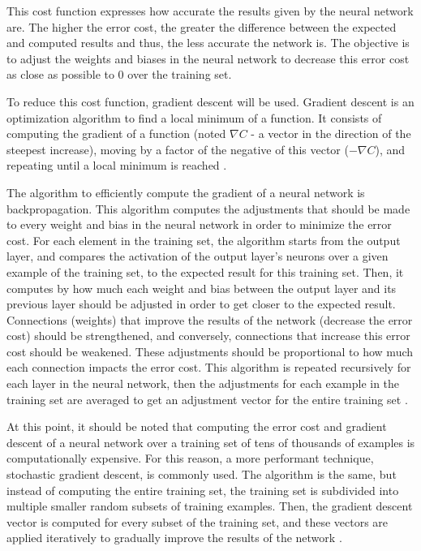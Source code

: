 \documentclass[12pt,a4paper,notitlepage]{article}
\begin{document}
This cost function expresses how accurate the results given by the neural network are. The higher the error cost, the greater the difference between the expected and computed results and thus, the less accurate the network is. The objective is to adjust the weights and biases in the neural network to decrease this error cost as close as possible to 0 over the training set.

To reduce this cost function, gradient descent will be used. Gradient descent is an optimization algorithm to find a local minimum of a function. It consists of computing the gradient of a function (noted \(\nabla C\) - a vector in the direction of the steepest increase), moving by a factor of the negative of this vector (\(-\nabla C\)), and repeating until a local minimum is reached \cite{sanderson_gradient_2017}.

The algorithm to efficiently compute the gradient of a neural network is backpropagation. This algorithm computes the adjustments that should be made to every weight and bias in the neural network in order to minimize the error cost. For each element in the training set, the algorithm starts from the output layer, and compares the activation of the output layer's neurons over a given example of the training set, to the expected result for this training set. Then, it computes by how much each weight and bias between the output layer and its previous layer should be adjusted in order to get closer to the expected result. Connections (weights) that improve the results of the network (decrease the error cost) should be strengthened, and conversely, connections that increase this error cost should be weakened. These adjustments should be proportional to how much each connection impacts the error cost. This algorithm is repeated recursively for each layer in the neural network, then the adjustments for each example in the training set are averaged to get an adjustment vector for the entire training set \cite{sanderson_gradient_2017}.

At this point, it should be noted that computing the error cost and gradient descent of a neural network over a training set of tens of thousands of examples is computationally expensive. For this reason, a more performant technique, stochastic gradient descent, is commonly used. The algorithm is the same, but instead of computing the entire training set, the training set is subdivided into multiple smaller random subsets of training examples. Then, the gradient descent vector is computed for every subset of the training set, and these vectors are applied iteratively to gradually improve the results of the network \cite{sanderson_gradient_2017}.
\end{document}
